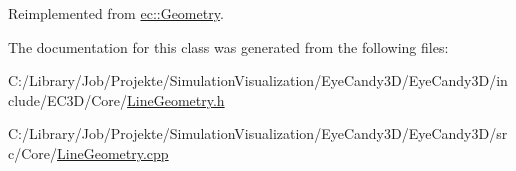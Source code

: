 Reimplemented from \mbox{\hyperlink{classec_1_1_geometry_a228d4a0fa01a17379f24aee2c769b501}{ec\+::\+Geometry}}.



The documentation for this class was generated from the following files\+:\begin{DoxyCompactItemize}
\item 
C\+:/\+Library/\+Job/\+Projekte/\+Simulation\+Visualization/\+Eye\+Candy3\+D/\+Eye\+Candy3\+D/include/\+E\+C3\+D/\+Core/\mbox{\hyperlink{_line_geometry_8h}{Line\+Geometry.\+h}}\item 
C\+:/\+Library/\+Job/\+Projekte/\+Simulation\+Visualization/\+Eye\+Candy3\+D/\+Eye\+Candy3\+D/src/\+Core/\mbox{\hyperlink{_line_geometry_8cpp}{Line\+Geometry.\+cpp}}\end{DoxyCompactItemize}

